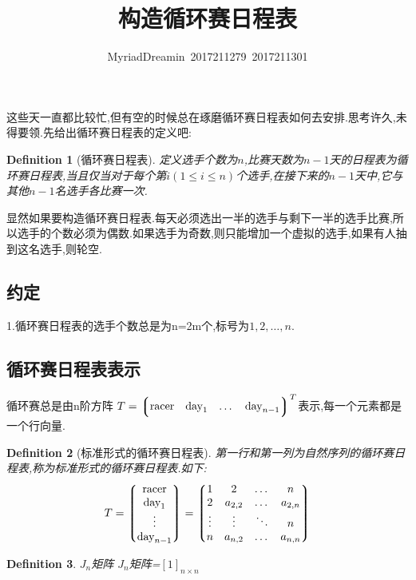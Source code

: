 \documentclass[UTF8]{ctexart}
\title{构造循环赛日程表}
\author{MyriadDreamin\ 2017211279\ 2017211301}
\date{}
\newcommand{\leg}{\left\lgroup}
\newcommand{\rig}{\right\rgroup}
\newtheorem{dft}{Definition}
\begin{document}
\setlength{\parindent}{2em}
\setlength{\baselineskip}{2.5em}
\maketitle
这些天一直都比较忙,但有空的时候总在琢磨循环赛日程表如何去安排.思考许久,未得要领.先给出循环赛日程表的定义吧:
\begin{dft}[循环赛日程表]
    定义选手个数为$n$,比赛天数为$n-1$天的日程表为循环赛日程表,当且仅当对于每个第$i(1\leqslant i\leqslant n)$个选手,在接下来的$n-1$天中,它与其他$n-1$名选手各比赛一次.
\end{dft}
\indent
显然如果要构造循环赛日程表.每天必须选出一半的选手与剩下一半的选手比赛,所以选手的个数必须为偶数.如果选手为奇数,则只能增加一个虚拟的选手,如果有人抽到这名选手,则轮空.
\subsection{约定}
1.循环赛日程表的选手个数总是为n=2m个,标号为$1,2,\dots,n$.
\subsection{循环赛日程表表示}
循环赛总是由n阶方阵
$T=\leg
    \begin{matrix}
        \text{racer} &
        \text{day}_1 &
        \dots&
        \text{day}_{n-1}
    \end{matrix}
\rig^{T}$表示,每一个元素都是一个行向量.
\begin{dft}[标准形式的循环赛日程表]第一行和第一列为自然序列的循环赛日程表,称为标准形式的循环赛日程表.如下:
    $$
        T=\leg
        \begin{matrix}
            \text{racer}\\
            \text{day}_1\\
            \vdots\\
            \text{day}_{n-1}\\
        \end{matrix}
        \rig=
        \leg
        \begin{matrix}
            1&2&\dots&n\\
            2&a_{2,2}&\dots&a_{2,n}\\
            \vdots&\vdots&\ddots&n\\
            n&a_{n,2}&\dots&a_{n,n}\\
        \end{matrix}
        \rig
    $$
\end{dft}
\begin{dft}{$J_n$矩阵}
    $J_n$矩阵=$[1]_{n\times n}$
\end{dft}
\end{document}

